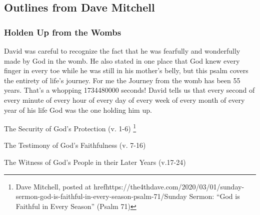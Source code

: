 \subsection{Outlines from Dave Mitchell}

\subsubsection{Holden Up from the Wombs}
David was careful to recognize the fact that he was fearfully and wonderfully made by God in the womb. He also stated in one place that God knew every finger in every toe while he was still in his mother's belly, but this psalm covers the entirety of life's journey. For me the Journey from the womb has been 55 years. That's a whopping 1734480000 seconds! David tells us that every second of every minute of every hour of every day of every week of every month of every year of his life God was the one holding him up.


\begin{compactenum}[I.][7]
    \item The Security of God’s Protection (v. 1-6) \footnote{Dave Mitchell, posted at href{https://the4thdave.com/2020/03/01/sunday-sermon-god-is-faithful-in-every-season-psalm-71/}{Sunday Sermon: ``God is Faithful in Every Season'' (Psalm 71)}}
    \item The Testimony of God’s Faithfulness (v. 7-16)
    \item The Witness of God’s People in their Later Years (v.17-24)
\end{compactenum}